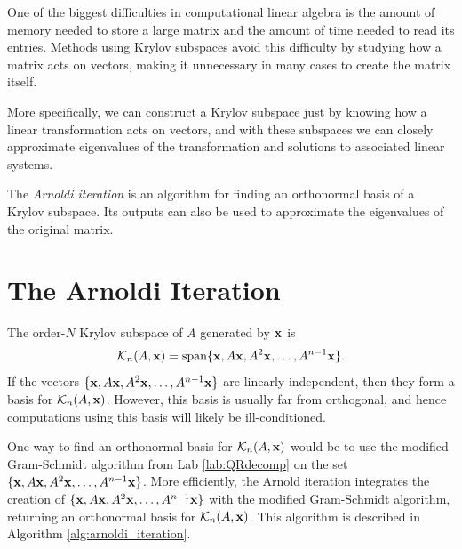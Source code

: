 \label{lab:kry_arnoldi}


One of the biggest difficulties in computational linear algebra is the amount of memory needed to store a large matrix and the amount of time needed to read its entries.
Methods using Krylov subspaces avoid this difficulty by studying how a matrix acts on vectors, making it unnecessary in many cases to create the matrix itself.

More specifically, we can construct a Krylov subspace just by knowing how a linear transformation acts on vectors, and with these subspaces we can closely approximate eigenvalues of the transformation and solutions to associated linear systems.

The \emph{Arnoldi iteration} is an algorithm for finding an orthonormal basis of a Krylov subspace. 
Its outputs can also be used to approximate the eigenvalues of the original matrix.

\section*{The Arnoldi Iteration}
The order-$N$ Krylov subspace of $A$ generated by ${\bf x}$ is 
\[
\mathcal{K}_n(A, {\bf x}) =\text{span} \{{\bf x}, A{\bf x}, A^2{\bf x}, \ldots, A^{n-1}{\bf x}\}.
\]
If the vectors $\{{\bf x}, A{\bf x}, A^2{\bf x}, \ldots, A^{n-1}{\bf x}\}$ are linearly independent, then they form a basis for $\mathcal{K}_n(A,{\bf x})$. 
However, this basis is usually far from orthogonal, and hence computations using this basis will likely be ill-conditioned.

One way to find an orthonormal basis for $\mathcal{K}_n(A,{\bf x})$ would be to use the modified Gram-Schmidt algorithm from Lab \ref{lab:QRdecomp} on the set $\{{\bf x}, A{\bf x}, A^2{\bf x}, \ldots, A^{n-1}{\bf x}\}$.
More efficiently, the Arnold iteration integrates the creation of $\{{\bf x}, A{\bf x}, A^2{\bf x}, \ldots, A^{n-1}{\bf x}\}$ with the modified Gram-Schmidt algorithm, returning an orthonormal basis for $\mathcal{K}_n(A,{\bf x})$. This algorithm is described in Algorithm \ref{alg:arnoldi_iteration}.





